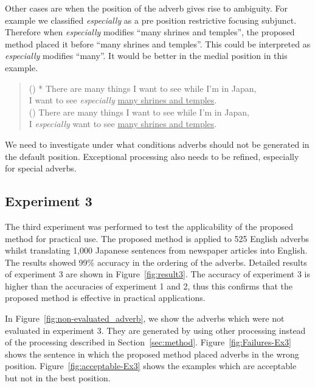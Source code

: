 
Other cases are when the position of the adverb gives rise to ambiguity.
For example we classified {\em especially} as a pre position 
restrictive focusing subjunct. 
Therefore when {\em especially} modifies ``many shrines 
and temples'', the proposed method placed it before 
``many shrines and temples''. 
This could be interpreted as {\em especially} modifies ``many''.
It would be better in the medial position in this example.

\begin{singlespace}
\begin{quote}
 \small
 ()
 * There are many things I want to see while I'm in Japan, \\
 \hspace*{5mm}
 I want to see {\em especially} \underline{many shrines and temples}. \\
 ()
 There are many things I want to see while I'm in Japan, \\
 \hspace*{5mm}
 I {\em especially} want to see \underline{many shrines and temples}.
\end{quote}
\end{singlespace}

We need to investigate under what conditions adverbs should not be 
generated in the default position.
Exceptional processing also needs to be refined, especially for 
special adverbs.

\subsection{Experiment 3}

The third experiment was performed to test the applicability of the
proposed method for practical use. 
The proposed method is applied to 525 English adverbs whilst 
translating 1,000 Japanese sentences from newspaper articles into English.  
The results showed  99\% accuracy in the ordering of the adverbs.  
Detailed results of experiment 3 are shown in Figure~\ref{fig:result3}. 
The accuracy of experiment 3 is higher than the accuracies of experiment 1 
and 2, thus this confirms that the proposed method is effective 
in practical applications.

In Figure~\ref{fig:non-evaluated_adverb}, we show the adverbs which
were not evaluated in experiment 3.
They are generated by using other processing instead of the processing 
described in Section~\ref{sec:method}.
Figure~\ref{fig:Failures-Ex3} shows the sentence in which the proposed method
placed adverbs in the wrong position. Figure~\ref{fig:acceptable-Ex3} shows 
the examples which are acceptable but not in the best position.

